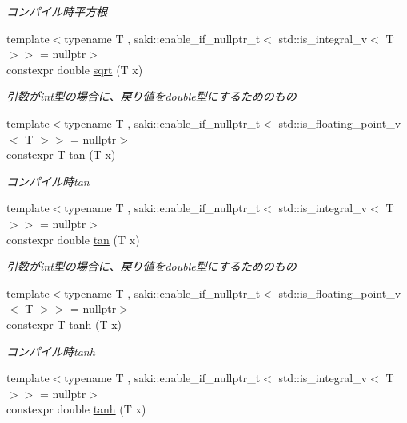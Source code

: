 \begin{DoxyCompactItemize}
\begin{DoxyCompactList}\small\item\em コンパイル時平方根 \end{DoxyCompactList}\item 
{\footnotesize template$<$typename T , saki\+::enable\+\_\+if\+\_\+nullptr\+\_\+t$<$ std\+::is\+\_\+integral\+\_\+v$<$ T $>$$>$  = nullptr$>$ }\\constexpr double \mbox{\hyperlink{namespacesaki_a66fac13294984ad19b8b7fec3b5466b5}{sqrt}} (T x)
\begin{DoxyCompactList}\small\item\em 引数がint型の場合に、戻り値をdouble型にするためのもの \end{DoxyCompactList}\item 
{\footnotesize template$<$typename T , saki\+::enable\+\_\+if\+\_\+nullptr\+\_\+t$<$ std\+::is\+\_\+floating\+\_\+point\+\_\+v$<$ T $>$$>$  = nullptr$>$ }\\constexpr T \mbox{\hyperlink{namespacesaki_a491321db8475898649b625dca5401726}{tan}} (T x)
\begin{DoxyCompactList}\small\item\em コンパイル時tan \end{DoxyCompactList}\item 
{\footnotesize template$<$typename T , saki\+::enable\+\_\+if\+\_\+nullptr\+\_\+t$<$ std\+::is\+\_\+integral\+\_\+v$<$ T $>$$>$  = nullptr$>$ }\\constexpr double \mbox{\hyperlink{namespacesaki_a52704083849bbdf4ab635cca985c00ae}{tan}} (T x)
\begin{DoxyCompactList}\small\item\em 引数がint型の場合に、戻り値をdouble型にするためのもの \end{DoxyCompactList}\item 
{\footnotesize template$<$typename T , saki\+::enable\+\_\+if\+\_\+nullptr\+\_\+t$<$ std\+::is\+\_\+floating\+\_\+point\+\_\+v$<$ T $>$$>$  = nullptr$>$ }\\constexpr T \mbox{\hyperlink{namespacesaki_af2674216630169ce211f8076492ce14e}{tanh}} (T x)
\begin{DoxyCompactList}\small\item\em コンパイル時tanh \end{DoxyCompactList}\item 
{\footnotesize template$<$typename T , saki\+::enable\+\_\+if\+\_\+nullptr\+\_\+t$<$ std\+::is\+\_\+integral\+\_\+v$<$ T $>$$>$  = nullptr$>$ }\\constexpr double \mbox{\hyperlink{namespacesaki_a5faf83bc9a4a7e981275deba551d2f3f}{tanh}} (T x)

\end{DoxyCompactItemize}
